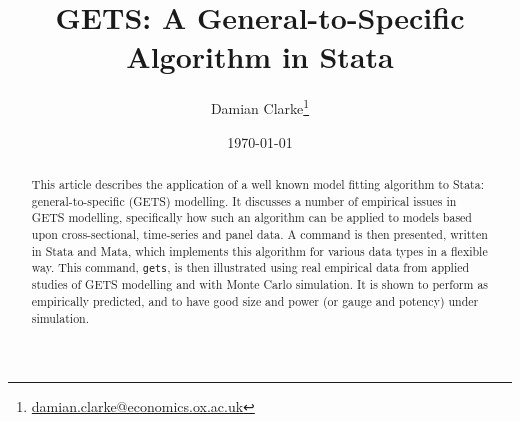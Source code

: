 \documentclass{article}[11pt]
\title{GETS: A General-to-Specific Algorithm in Stata}
\author{Damian Clarke\thanks{\href{mailto:damian.clarke@economics.ox.ac.uk}{damian.clarke@economics.ox.ac.uk}}}
\date{\today}
\begin{document}
\maketitle
\begin{abstract}
 This article describes the application of a well known model fitting algorithm to Stata: general-to-specific
 (GETS) modelling.  It discusses a number of empirical issues in GETS modelling, specifically how such an
 algorithm can be applied to models based upon cross-sectional, time-series and panel data.  A command is then
 presented, written in Stata and Mata, which implements this algorithm for various data types in a flexible way.
 This command, \texttt{gets}, is then illustrated using real empirical data from applied studies of GETS modelling 
 and with Monte Carlo simulation.  It is shown to perform as empirically predicted, and to have good size and power 
 (or gauge and potency) under simulation.
\end{abstract}
\end{document}
